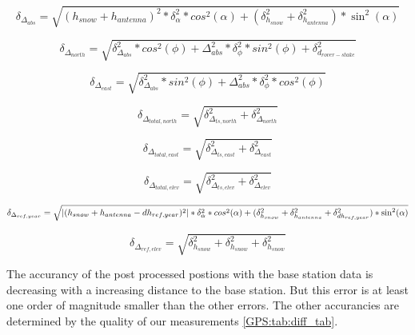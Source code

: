 
\begin{equation}
	\delta_{\Delta_{abs}} = \sqrt{(h_{snow} + h_{antenna})^2 * \delta_{\alpha}^2 * cos^2(\alpha) + (\delta_{h_{snow}}^2 + \delta_{h_{antenna}}^2) * \sin^2(\alpha)}
\end{equation}

\begin{equation}
	\delta_{\Delta_{north}} = \sqrt{\delta_{\Delta_{abs}}^2 * cos^2(\phi) + \Delta_{abs}^2 * \delta_{\phi}^2 * sin^2(\phi) + \delta_{d_{rover-stake}}^2}
\end{equation}

\begin{equation}
	\delta_{\Delta_{east}} = \sqrt{\delta_{\Delta_{abs}}^2 * sin^2(\phi) + \Delta_{abs}^2 * \delta_{\phi}^2 * cos^2(\phi)}
\end{equation}

\begin{equation}
	\delta_{\Delta_{total,north}} = \sqrt{\delta_{\Delta_{ts,north}}^2 + \delta_{\Delta_{north}}^2}
\end{equation}

\begin{equation}
	\delta_{\Delta_{total,east}} = \sqrt{\delta_{\Delta_{ts,east}}^2 + \delta_{\Delta_{east}}^2}
\end{equation}

\begin{equation}
	\delta_{\Delta_{total,elev}} = \sqrt{\delta_{\Delta_{ts,elev}}^2 +\delta_{\Delta_{elev}}^2}
\end{equation}

\begin{equation}
\delta_{\Delta_{ref,year}} = \sqrt{\left|(h_{snow} + h_{antenna} - dh_{ref,year})^2\right| * \delta_{\alpha}^2 * cos^2(\alpha)\\
+ (\delta_{h_{snow}}^2 + \delta_{h_{antenna}}^2 + \delta_{dh_{ref,year}}^2) * \sin^2(\alpha)}
\end{equation}

\begin{equation}
	\delta_{\Delta_{ref, elev}} = \sqrt{\delta_{h_{snow}}^2 + \delta_{h_{snow}}^2 + \delta_{h_{snow}}^2}
\end{equation}


The accurancy of the post processed postions with the base station data is decreasing with a increasing distance to the base station. 
But this error is at least one order of magnitude smaller than the other errors. 
The other accurancies are determined by the quality of our measurements \ref{GPS:tab:diff_tab}.


